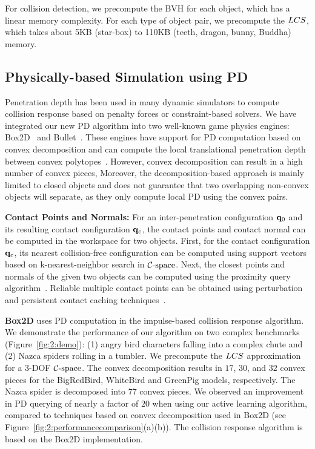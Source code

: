 For collision detection, we precompute the BVH for each object, which has a linear memory complexity. For each type of object pair, we precompute the $LCS$, which takes about 5KB (star-box) to 110KB (teeth, dragon, bunny, Buddha) memory.





\subsection{Physically-based Simulation using PD}
Penetration depth has been used in many dynamic simulators to compute collision response based on penalty forces or constraint-based solvers.
We have integrated our new PD algorithm into two well-known game physics
engines: Box2D~\cite{Erin:2012:Box2D} and Bullet~\cite{Erwin:2012:Bullet}. These engines have support for PD computation based on
convex decomposition and can compute the local translational penetration depth between convex polytopes~\cite{Gino:2001:GDC}.
However, convex decomposition can result in a high number of convex pieces, Moreover, the decomposition-based approach is mainly limited to closed
objects and does not guarantee that two
overlapping non-convex objects will separate, as they only compute local PD using the convex pairs.

\textbf{Contact Points and Normals:} For an inter-penetration configuration $\mathbf q_0$ and its resulting contact configuration $\mathbf q_c$, the contact points and contact normal can be computed in the workspace for two objects. First, for the contact configuration $\mathbf q_c$, its nearest collision-free configuration can be computed using support vectors based on k-nearest-neighbor search in $\mathcal C\text{-space}$. Next, the closest points and normals of the given two objects can be computed using the proximity query algorithm~\cite{LGLM00}. Reliable multiple contact points can be obtained using perturbation and persistent contact caching techniques~\cite{Erwin:2012:Bullet}.

\textbf{Box2D} uses PD computation in the impulse-based collision response algorithm.
We demonstrate the performance of our algorithm on
two complex benchmarks (Figure~\ref{fig:2:demo}): (1) angry bird characters falling into a complex chute and (2) Nazca spiders rolling in a tumbler. We precompute the $LCS$ approximation for a 3-DOF $\mathcal C\text{-space}$.
The convex decomposition results in $17$, $30$, and $32$ convex pieces for the BigRedBird, WhiteBird and GreenPig models, respectively. The Nazca spider is decomposed into $77$ convex pieces. We observed an improvement in PD querying of nearly a factor of $20$ when using our active learning algorithm, compared to
techniques based on convex decomposition used in Box2D (see Figure~\ref{fig:2:performancecomparison}(a)(b)). The collision response algorithm is based on the Box2D implementation.


